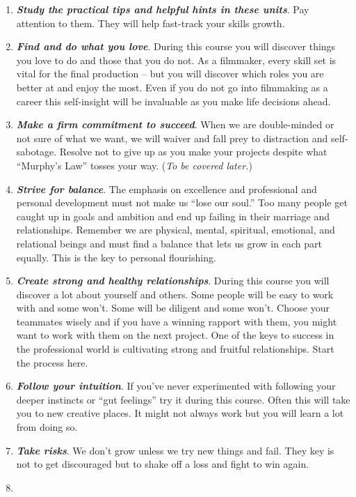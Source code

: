 \documentclass[
  letterpaper,
  DIV=11,
  numbers=noendperiod]{scrreprt}
\begin{document}
\begin{enumerate}
\item
  \textbf{\emph{Study the practical tips and helpful hints in these
  units}}. Pay attention to them. They will help fast-track your skills
  growth.
\item
  \textbf{\emph{Find and do what you love}}. During this course you will
  discover things you love to do and those that you do not. As a
  filmmaker, every skill set is vital for the final production -- but
  you will discover which roles you are better at and enjoy the most.
  Even if you do not go into filmmaking as a career this self-insight
  will be invaluable as you make life decisions ahead.
\item
  \textbf{\emph{Make a firm commitment to succeed}}. When we are
  double-minded or not sure of what we want, we will waiver and fall
  prey to distraction and self-sabotage. Resolve not to give up as you
  make your projects despite what ``Murphy's Law'' tosses your way.
  (\emph{To be covered later.})
\item
  \textbf{\emph{Strive for balance}}. The emphasis on excellence and
  professional and personal development must not make us ``lose our
  soul.'' Too many people get caught up in goals and ambition and end up
  failing in their marriage and relationships. Remember we are physical,
  mental, spiritual, emotional, and relational beings and must find a
  balance that lets us grow in each part equally. This is the key to
  personal flourishing.
\item
  \textbf{\emph{Create strong and healthy relationships}}. During this
  course you will discover a lot about yourself and others. Some people
  will be easy to work with and some won't. Some will be diligent and
  some won't. Choose your teammates wisely and if you have a winning
  rapport with them, you might want to work with them on the next
  project. One of the keys to success in the professional world is
  cultivating strong and fruitful relationships. Start the process here.
\item
  \textbf{\emph{Follow your intuition}}. If you've never experimented
  with following your deeper instincts or ``gut feelings'' try it during
  this course. Often this will take you to new creative places. It might
  not always work but you will learn a lot from doing so.
\item
  \textbf{\emph{Take risks}}. We don't grow unless we try new things and
  fail. They key is not to get discouraged but to shake off a loss and
  fight to win again.
\item

\end{enumerate}
\end{document}
